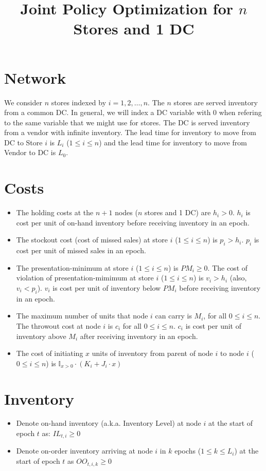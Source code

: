 \documentclass[12pt]{amsart}
\title{Joint Policy Optimization for $n$ Stores and 1 DC}
\author{}
\date{} %
\begin{document}
\maketitle

\section{Network}

We consider $n$ stores indexed by $i = 1, 2, \ldots, n$. The $n$ stores are served inventory from a common DC. In general, we will index a DC variable with 0 when refering to the same variable that we might use for stores. The DC is served inventory from a vendor with infinite inventory. The lead time for inventory to move from DC to Store $i$ is $L_i$ ($1 \leq i \leq n$) and the lead time for inventory to move from Vendor to DC is $L_0$.

\section{Costs}
\begin{itemize}
\item The holding costs at the $n+1$ nodes ($n$ stores and 1 DC) are $h_i > 0$. $h_i$ is cost per unit of on-hand inventory before receiving inventory in an epoch.
\item The stockout cost (cost of missed sales) at store $i$ ($1 \leq i \leq n$) is $p_i > h_i$. $p_i$ is cost per unit of missed sales in an epoch.
\item The presentation-minimum at store $i$ ($1 \leq i \leq n$) is $PM_i \geq 0$. The cost of violation of presentation-mimimum at store $i$ ($1 \leq i \leq n$) is $v_i > h_i$ (also, $v_i < p_i$). $v_i$ is cost per unit of inventory below $PM_i$ before receiving inventory in an epoch.
\item The maximum number of units that node $i$ can carry is $M_i$, for all $0 \leq i \leq n$. The throwout cost at node $i$ is $c_i$ for all $0 \leq i \leq n$. $c_i$ is cost per unit of inventory above $M_i$ after receiving inventory in an epoch.
\item The cost of initiating $x$ units of inventory from parent of node $i$ to node $i$ ($0 \leq i \leq n$) is $\mathbb{I}_{x > 0} \cdot (K_i + J_i \cdot x)$
\end{itemize}

\section{Inventory}
\begin{itemize}
\item Denote on-hand inventory (a.k.a. Inventory Level) at node $i$ at the start of epoch $t$ as: $IL_{t,i} \geq 0$
\item Denote on-order inventory arriving at node $i$ in $k$ epochs ($1 \leq k \leq L_i$) at the start of epoch $t$ as $OO_{t,i,k} \geq 0$
\end{itemize}
\end{document}
